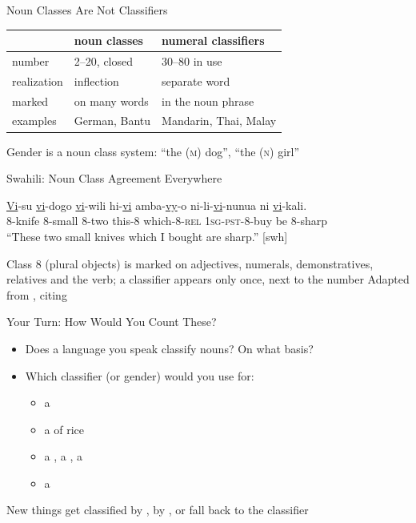 \documentclass{beamer}
\renewcommand{\exfont}{\large}
\renewcommand{\glossfont}{\large}
\renewcommand{\transfont}{\large}
\begin{document}
\begin{frame}{Noun Classes Are Not Classifiers}
  \large
  \begin{center}
  \begin{tabular}{lll}
    \toprule
    & noun classes & numeral classifiers \\
    \midrule
    number      & 2--20, closed  & 30--80 in use \\
    realization & inflection     & separate word \\
    marked      & on many words  & in the noun phrase \\
    examples    & German, Bantu  & Mandarin, Thai, Malay \\
    \bottomrule
  \end{tabular}
  \end{center}

  \vfill
  \normalsize
  Gender is a noun class system:  ``the (\textsc{m}) dog'',
   ``the (\textsc{n}) girl'' \citep{dixon:1986}
\end{frame}

\begin{frame}{Swahili: Noun Class Agreement Everywhere}
  \begin{exe}
    \renewcommand{\exfont}{\normalsize}
    \renewcommand{\glossfont}{\normalsize}
    \renewcommand{\transfont}{\normalsize}
    \ex
    \gll \ul{Vi}-su \ul{vi}-dogo \ul{vi}-wili hi-\ul{vi} amba-\ul{vy}-o ni-li-\ul{vi}-nunua ni \ul{vi}-kali. \\
         8-knife 8-small 8-two this-8 which-8-\textsc{rel} 1\textsc{sg}-\textsc{pst}-8-buy be 8-sharp \\
    \trans ``These two small knives which I bought are sharp.'' [swh]
  \end{exe}
  \vfill
  \large
  Class 8 (plural objects) is marked on adjectives, numerals,
  demonstratives, relatives and the verb; a classifier appears only
  once, next to the number
  \vfill
  \normalsize
  Adapted from \citet[181]{saeed:2009}, citing \citet[310]{allan:2001}
\end{frame}

\begin{frame}{Your Turn: How Would You Count These?}
  \Large
  \begin{itemize}
  \item Does a language you speak classify nouns? On what basis?
  \item Which classifier (or gender) would you use for:
    \begin{itemize}
    \item a 
    \item a  of rice
    \item a , a , a 
    \item a 
    \end{itemize}
  \end{itemize}
  \pause
  \vfill
  \normalsize
  New things get classified by , by , or
  fall back to the  classifier
\end{frame}
\end{document}
